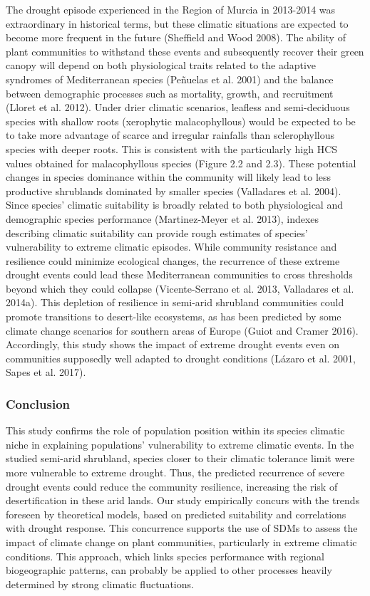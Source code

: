 \documentclass[11pt,twoside]{reedthesis}
\begin{document}
The drought episode experienced in the Region of Murcia in 2013-2014 was
extraordinary in historical terms, but these climatic situations are
expected to become more frequent in the future (Sheffield and Wood
2008). The ability of plant communities to withstand these events and
subsequently recover their green canopy will depend on both
physiological traits related to the adaptive syndromes of Mediterranean
species (Peñuelas et al. 2001) and the balance between demographic
processes such as mortality, growth, and recruitment (Lloret et al.
2012). Under drier climatic scenarios, leafless and semi-deciduous
species with shallow roots (xerophytic malacophyllous) would be expected
to be to take more advantage of scarce and irregular rainfalls than
sclerophyllous species with deeper roots. This is consistent with the
particularly high HCS values obtained for malacophyllous species (Figure
2.2 and 2.3). These potential changes in species dominance within the
community will likely lead to less productive shrublands dominated by
smaller species (Valladares et al. 2004). Since species' climatic
suitability is broadly related to both physiological and demographic
species performance (Martinez-Meyer et al. 2013), indexes describing
climatic suitability can provide rough estimates of species'
vulnerability to extreme climatic episodes. While community resistance
and resilience could minimize ecological changes, the recurrence of
these extreme drought events could lead these Mediterranean communities
to cross thresholds beyond which they could collapse (Vicente-Serrano et
al. 2013, Valladares et al. 2014a). This depletion of resilience in
semi-arid shrubland communities could promote transitions to desert-like
ecosystems, as has been predicted by some climate change scenarios for
southern areas of Europe (Guiot and Cramer 2016). Accordingly, this
study shows the impact of extreme drought events even on communities
supposedly well adapted to drought conditions (Lázaro et al. 2001, Sapes
et al. 2017).\par

\subsubsection{Conclusion}\label{conclusion}

This study confirms the role of population position within its species
climatic niche in explaining populations' vulnerability to extreme
climatic events. In the studied semi-arid shrubland, species closer to
their climatic tolerance limit were more vulnerable to extreme drought.
Thus, the predicted recurrence of severe drought events could reduce the
community resilience, increasing the risk of desertification in these
arid lands. Our study empirically concurs with the trends foreseen by
theoretical models, based on predicted suitability and correlations with
drought response. This concurrence supports the use of SDMs to assess
the impact of climate change on plant communities, particularly in
extreme climatic conditions. This approach, which links species
performance with regional biogeographic patterns, can probably be
applied to other processes heavily determined by strong climatic
fluctuations.\par
\end{document}

